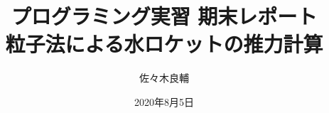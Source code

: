 \documentclass[uplatex,a4j,11pt]{jsarticle}
\begin{document}
\title{プログラミング実習 期末レポート\\
\large 粒子法による水ロケットの推力計算}
\author{佐々木良輔}
\date{2020年8月5日}
\maketitle
\newpage








\newpage

\end{document}
